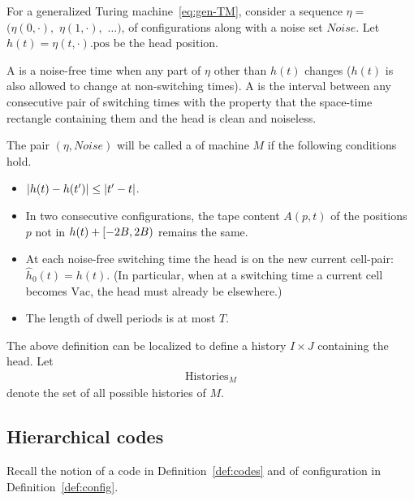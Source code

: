 \documentclass[11pt]{memoir}
\theoremstyle{definition} %
\renewcommand{\le}{\leq}
\def\B{B}
\newcommand{\h}{h} %
\newcommand{\hc}{\hat h}
\newcommand{\Noise}{\mathit{Noise}}
\newcommand{\pos}{\mathrm{pos}}
\newcommand{\Tu}{T}
\newcommand{\Histories}{\mathrm{Histories}}
\newcommand{\Vacant}{\mathrm{Vac}}
\begin{document}
\begin{definition}[History]
For a generalized Turing machine~\eqref{eq:gen-TM}, consider
a sequence \( \eta = \) \( ( \eta(0,\cdot),\) \( \eta(1,\cdot),\) \( \dots) \),
of configurations along with a noise set \( \Noise \).
Let \( \h(t)= \eta(t,\cdot).\pos \) be the head position.

A  is a noise-free time when any part of \( \eta \) other than \( \h(t) \)
changes (\( \h(t) \) is also allowed to change at non-switching times).
A  is the interval between any consecutive pair of
switching times with the property that the
space-time rectangle containing them and the head is clean and noiseless.

The pair \(  (\eta,\Noise) \) will be called a 
of machine \( M \) if the following conditions hold.
\begin{itemize}
\item \( \abs{\h(t) - \h(t')} \le \abs{t' - t} \).
  
\item In two consecutive configurations, the tape content \( A(p,t) \) of the positions \( p \)
  not in \( \h(t) + \lint{-2\B}{2\B} \) remains the same.
\item At each noise-free switching time the head is on the new current cell-pair:
  \( \hc_{0}(t)=\h(t) \).
(In particular, when at a switching time a current cell becomes
\( \Vacant \), the head must already be elsewhere.)

\item The length of dwell periods is at most \( \Tu \).

\end{itemize}
The above definition can be localized to define a history \( I\times J \) containing the head.
Let
\begin{align*}
  \Histories_{M}
\end{align*}
denote the set of all possible histories of \( M \).
\end{definition}



\subsection{Hierarchical codes}\label{sec:hier-codes}

Recall the notion of a code in Definition~\ref{def:codes} and of configuration
in Definition~\ref{def:config}.
\end{document}
